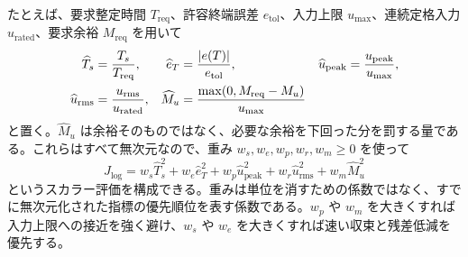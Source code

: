 たとえば、要求整定時間 $T_{\mathrm{req}}$、許容終端誤差 $e_{\mathrm{tol}}$、入力上限 $u_{\max}$、連続定格入力 $u_{\mathrm{rated}}$、要求余裕 $M_{\mathrm{req}}$ を用いて
\begin{align}
  \widehat{T}_s&=\frac{T_s}{T_{\mathrm{req}}},
  &
  \widehat{e}_T&=\frac{\left|e(T)\right|}{e_{\mathrm{tol}}},
  &
  \widehat{u}_{\mathrm{peak}}&=\frac{u_{\mathrm{peak}}}{u_{\max}},\\
  \widehat{u}_{\mathrm{rms}}&=\frac{u_{\mathrm{rms}}}{u_{\mathrm{rated}}},
  &
  \widehat{M}_u&=
  \frac{\max(0,M_{\mathrm{req}}-M_u)}{u_{\max}}
\end{align}
と置く。$\widehat{M}_u$ は余裕そのものではなく、必要な余裕を下回った分を罰する量である。これらはすべて無次元なので、重み $w_s,w_e,w_p,w_r,w_m\ge0$ を使って
\begin{equation}
  J_{\mathrm{log}}
  =
  w_s\widehat{T}_s^2
  +w_e\widehat{e}_T^2
  +w_p\widehat{u}_{\mathrm{peak}}^2
  +w_r\widehat{u}_{\mathrm{rms}}^2
  +w_m\widehat{M}_u^2
  \label{eq:normalized-log-cost}
\end{equation}
というスカラー評価を構成できる。重みは単位を消すための係数ではなく、すでに無次元化された指標の優先順位を表す係数である。$w_p$ や $w_m$ を大きくすれば入力上限への接近を強く避け、$w_s$ や $w_e$ を大きくすれば速い収束と残差低減を優先する。

